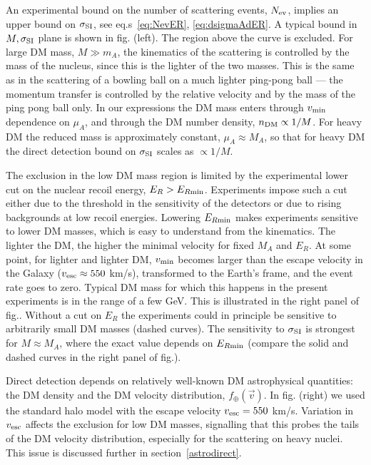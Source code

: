 An experimental bound on the number of scattering events, $N_{\rm ev}$, 
implies an upper bound on $\sigma_{\rm SI}$, see eq.s~\eqref{eq:NevER}, \eqref{eq:dsigmaAdER}. A typical bound in $M, \sigma_{\rm SI}$ plane is shown in fig. (left). The region above the curve is excluded. 
For large DM mass, $M\gg m_A$, the kinematics of the scattering is controlled by the mass of the nucleus, since this is the lighter of the two masses. This is the same as in the scattering of a bowling ball on a much lighter ping-pong ball ---  the momentum transfer is controlled by the relative velocity and by the mass of the ping pong ball only. In our expressions the DM mass enters through $v_{\rm min}$ dependence on $\mu_A$,  and through the DM number density, $n_{\rm DM}\propto 1/M$.  For heavy DM the reduced mass is approximately constant, $\mu_A \approx M_A$, so that
for heavy DM the direct detection bound on $\sigma_{\rm SI}$ scales as $\propto 1/M$. 

\smallskip

The exclusion in the low DM mass region is limited by the experimental
lower cut on the nuclear recoil energy, $E_R>E_{R\rm min}$.  
Experiments impose such a cut either due to the threshold in the sensitivity of the detectors or due to rising backgrounds at low recoil energies. 
Lowering $E_{R\rm min}$ makes experiments sensitive to lower DM masses, which is easy to understand from the kinematics. The lighter  the DM, the higher the minimal velocity for fixed $M_A$ and $E_R$. At some point, for lighter and lighter DM,  $v_{\rm min}$ becomes larger than the escape velocity in the Galaxy ($v_{\rm esc}\approx 550$ km/s), transformed to the Earth's frame, and the event rate goes to zero. Typical DM mass for which this happens in the present experiments is in the range of a few GeV. This is illustrated in the right panel of fig.. 
Without a cut on $E_R$ the experiments could in principle be sensitive to arbitrarily small DM masses (dashed curves). 
The sensitivity to  $\sigma_{\rm SI}$ is strongest for $M \approx M_A$, 
where the exact value 
depends on $E_{R\rm min}$ (compare the solid and dashed curves in the right panel of fig.). 

\medskip


Direct detection depends on relatively well-known DM astrophysical quantities: 
the DM density and the DM velocity distribution, $f_\oplus(\vec v)$. In fig. (right) we used the standard halo model with the escape velocity $v_{\rm esc}=550$ km/s. Variation in $v_{\rm esc}$ affects the exclusion for low DM masses, signalling that this probes the tails of the DM velocity distribution, especially for the scattering on heavy nuclei. 
This issue is discussed further in section~\ref{astrodirect}.

